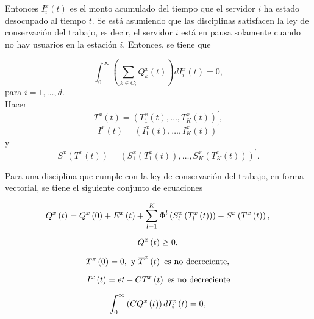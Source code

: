 Entonces $I_{i}^{x}\left(t\right)$ es el monto acumulado del
tiempo que el servidor $i$ ha estado desocupado al tiempo $t$. Se
est\'a asumiendo que las disciplinas satisfacen la ley de
conservaci\'on del trabajo, es decir, el servidor $i$ est\'a en
pausa solamente cuando no hay usuarios en la estaci\'on $i$.
Entonces, se tiene que

\begin{equation}
\int_{0}^{\infty}\left(\sum_{k\in
C_{i}}Q_{k}^{x}\left(t\right)\right)dI_{i}^{x}\left(t\right)=0,
\end{equation}
para $i=1,\ldots,d$.\\

Hacer
\[T^{x}\left(t\right)=\left(T_{1}^{x}\left(t\right),\ldots,T_{K}^{x}\left(t\right)\right)^{'},\]
\[I^{x}\left(t\right)=\left(I_{1}^{x}\left(t\right),\ldots,I_{K}^{x}\left(t\right)\right)^{'}\]
y
\[S^{x}\left(T^{x}\left(t\right)\right)=\left(S_{1}^{x}\left(T_{1}^{x}\left(t\right)\right),\ldots,S_{K}^{x}\left(T_{K}^{x}\left(t\right)\right)\right)^{'}.\]

Para una disciplina que cumple con la ley de conservaci\'on del
trabajo, en forma vectorial, se tiene el siguiente conjunto de
ecuaciones

\begin{equation}\label{Eq.MF.1.3}
Q^{x}\left(t\right)=Q^{x}\left(0\right)+E^{x}\left(t\right)+\sum_{l=1}^{K}\Phi^{l}\left(S_{l}^{x}\left(T_{l}^{x}\left(t\right)\right)\right)-S^{x}\left(T^{x}\left(t\right)\right),\\
\end{equation}

\begin{equation}\label{Eq.MF.2.3}
Q^{x}\left(t\right)\geq0,\\
\end{equation}

\begin{equation}\label{Eq.MF.3.3}
T^{x}\left(0\right)=0,\textrm{ y }\overline{T}^{x}\left(t\right)\textrm{ es no decreciente},\\
\end{equation}

\begin{equation}\label{Eq.MF.4.3}
I^{x}\left(t\right)=et-CT^{x}\left(t\right)\textrm{ es no
decreciente}\\
\end{equation}

\begin{equation}\label{Eq.MF.5.3}
\int_{0}^{\infty}\left(CQ^{x}\left(t\right)\right)dI_{i}^{x}\left(t\right)=0,\\
\end{equation}

